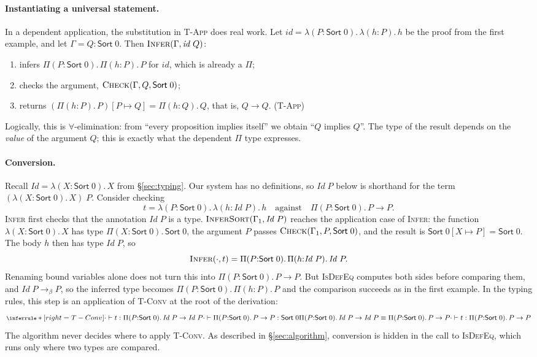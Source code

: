 \documentclass[acmsmall,screen,nonacm]{acmart}
\newcommand{\Sort}[1]{\mathsf{Sort}\;#1}
\newcommand{\tPi}[3]{\Pi(#1{:}#2).\,#3}
\newcommand{\tLam}[3]{\lambda(#1{:}#2).\,#3}
\newcommand{\subst}[3]{#1[#2 \mapsto #3]}
\newcommand{\betared}{\to_{\beta}}
\newcommand{\conv}{\equiv}
\begin{document}
\paragraph{Instantiating a universal statement.}
In a dependent application, the substitution in \textsc{T-App} does real work.
Let $\mathit{id} = \tLam{P}{\Sort{0}}{\tLam{h}{P}{h}}$ be the proof from the first example, and let $\Gamma = Q : \Sort{0}$.
Then $\textsc{Infer}(\Gamma, \mathit{id}\;Q)$:
\begin{enumerate}[nosep, label=\arabic*.]
  \item infers $\tPi{P}{\Sort{0}}{\tPi{h}{P}{P}}$ for $\mathit{id}$, which is already a $\Pi$;
  \item checks the argument, $\textsc{Check}(\Gamma, Q, \Sort{0})$;
  \item returns $\subst{(\tPi{h}{P}{P})}{P}{Q} = \tPi{h}{Q}{Q}$, that is, $Q \to Q$. \hfill (\textsc{T-App})
\end{enumerate}
Logically, this is $\forall$-elimination: from ``every proposition implies itself'' we obtain ``$Q$ implies $Q$''.
The type of the result depends on the \emph{value} of the argument $Q$; this is exactly what the dependent $\Pi$ type expresses.

\paragraph{Conversion.}
Recall $\mathit{Id} = \tLam{X}{\Sort{0}}{X}$ from \S\ref{sec:typing}.
Our system has no definitions, so $\mathit{Id}\;P$ below is shorthand for the term $(\tLam{X}{\Sort{0}}{X})\;P$.
Consider checking
\[
t = \tLam{P}{\Sort{0}}{\tLam{h}{\mathit{Id}\;P}{h}}
\quad\text{against}\quad
\tPi{P}{\Sort{0}}{P \to P}.
\]
\textsc{Infer} first checks that the annotation $\mathit{Id}\;P$ is a type.
$\textsc{InferSort}(\Gamma_1, \mathit{Id}\;P)$ reaches the application case of \textsc{Infer}:
the function $\tLam{X}{\Sort{0}}{X}$ has type $\tPi{X}{\Sort{0}}{\Sort{0}}$, the argument $P$ passes $\textsc{Check}(\Gamma_1, P, \Sort{0})$,
and the result is $\subst{\Sort{0}}{X}{P} = \Sort{0}$.
The body $h$ then has type $\mathit{Id}\;P$, so
\[
\textsc{Infer}(\cdot, t) = \tPi{P}{\Sort{0}}{\tPi{h}{\mathit{Id}\;P}{\mathit{Id}\;P}}.
\]
Renaming bound variables alone does not turn this into $\tPi{P}{\Sort{0}}{P \to P}$.
But \textsc{IsDefEq} computes both sides before comparing them, and $\mathit{Id}\;P \betared P$,
so the inferred type becomes $\tPi{P}{\Sort{0}}{\tPi{h}{P}{P}}$ and the comparison succeeds as in the first example.
In the typing rules, this step is an application of \textsc{T-Conv} at the root of the derivation:
\[
\footnotesize
\inferrule*[right=T-Conv]
  {\cdot \vdash t : \tPi{P}{\Sort{0}}{\mathit{Id}\;P \to \mathit{Id}\;P} \\
   \cdot \vdash \tPi{P}{\Sort{0}}{P \to P} : \Sort{0} \\
   \tPi{P}{\Sort{0}}{\mathit{Id}\;P \to \mathit{Id}\;P} \conv \tPi{P}{\Sort{0}}{P \to P}}
  {\cdot \vdash t : \tPi{P}{\Sort{0}}{P \to P}}
\]
The algorithm never decides where to apply \textsc{T-Conv}.
As described in \S\ref{sec:algorithm}, conversion is hidden in the call to \textsc{IsDefEq}, which runs only where two types are compared.
\end{document}
